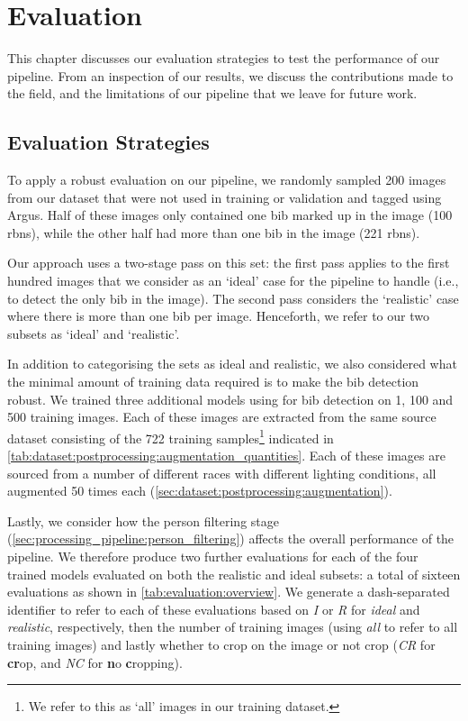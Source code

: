 \chapter{Evaluation}
\label{ch:evaluation}

This chapter discusses our evaluation strategies to test the performance of our pipeline. From an inspection of our results, we discuss the contributions made to the field, and the limitations of our pipeline that we leave for future work.

\section{Evaluation Strategies}
\label{sec:evaluation:strategies}

To apply a robust evaluation on our pipeline, we randomly sampled 200 images from our dataset that were not used in training or validation and tagged using Argus. Half of these images only contained one bib marked up in the image (100 \glspl{rbn}), while the other half had more than one bib in the image (221 \glspl{rbn}).

Our approach uses a two-stage pass on this set: the first pass applies to the first hundred images that we consider as an `ideal' case for the pipeline to handle (i.e., to detect the only bib in the image). The second pass considers the `realistic' case where there is more than one bib per image. Henceforth, we refer to our two subsets as `ideal' and `realistic'.

In addition to categorising the sets as ideal and realistic, we also considered what the minimal amount of training data required is to make the bib detection robust. We trained three additional models using \frcnn{} for bib detection on 1, 100 and 500 training images. Each of these images are extracted from the same source dataset consisting of the 722 training samples\footnote{We refer to this as `all' images in our training dataset.} indicated in \cref{tab:dataset:postprocessing:augmentation_quantities}. Each of these images are sourced from a number of different races with different lighting conditions, all augmented 50 times each (\cref{sec:dataset:postprocessing:augmentation}).

Lastly, we consider how the person filtering stage (\cref{sec:processing_pipeline:person_filtering}) affects the overall performance of the pipeline. We therefore produce two further evaluations for each of the four trained models evaluated on both the realistic and ideal subsets: a total of sixteen evaluations as shown in \cref{tab:evaluation:overview}. We generate a dash-separated identifier to refer to each of these evaluations based on \textit{I} or \textit{R} for \textit{ideal} and \textit{realistic}, respectively, then the number of training images (using \textit{all} to refer to all training images) and lastly whether to crop on the image or not crop (\textit{CR} for \textbf{cr}op, and \textit{NC} for \textbf{n}o \textbf{c}ropping).

